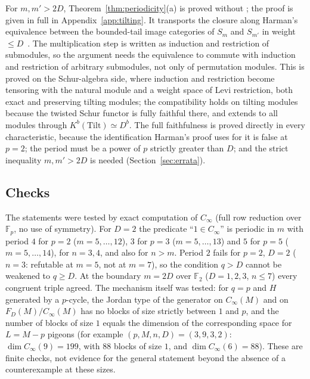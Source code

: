 For $m,m'>2D$, Theorem~\ref{thm:periodicity}(a) is proved without \cite{hone2025}; the proof is
given in full in Appendix~\ref{app:tilting}.  It transports the closure
along Harman's equivalence between the bounded-tail image categories of $S_m$ and $S_{m'}$ in weight
$\le D$~\cite[Thm.~2.9]{harman2015}.  The multiplication step is written as induction and
restriction of submodules, so the argument needs the equivalence to commute with induction
and restriction of arbitrary submodules, not only of permutation modules.  This is proved on
the Schur-algebra side, where induction and restriction become tensoring with the natural
module and a weight space of Levi restriction, both exact and preserving tilting modules; the
compatibility holds on tilting modules because the twisted Schur functor is fully faithful
there, and extends to all modules through $K^b(\mathrm{Tilt})\simeq D^b$.  The full
faithfulness is proved directly in every characteristic, because the identification Harman's
proof uses for it is false at $p=2$; the period must be a power of $p$ strictly greater than
$D$; and the strict inequality $m,m'>2D$ is needed (Section~\ref{sec:errata}).

\subsection{Checks}\label{sec:periodicity-checks}

The statements were tested by exact computation of $C_\infty$ (full row reduction over
$\mathbb F_p$, no use of symmetry).  For $D=2$ the predicate ``$1\in C_\infty$'' is periodic in
$m$ with period $4$ for $p=2$ ($m=5,\dots,12$), $3$ for $p=3$ ($m=5,\dots,13$) and $5$ for
$p=5$ ($m=5,\dots,14$), for $n=3,4$, and also for $n>m$.  Period $2$ fails for $p=2$, $D=2$
($n=3$: refutable at $m=5$, not at $m=7$), so the condition $q>D$ cannot be weakened to
$q\ge D$.  At the boundary $m=2D$ over $\mathbb F_2$ ($D=1,2,3$, $n\le7$) every congruent
triple agreed.  The mechanism itself was tested: for $q=p$ and $H$ generated by a $p$-cycle,
the Jordan type of the generator on $C_\infty(M)$ and on $F_D(M)/C_\infty(M)$ has no blocks of
size strictly between $1$ and $p$, and the number of blocks of size $1$ equals the dimension
of the corresponding space for $L=M-p$ pigeons (for example $(p,M,n,D)=(3,9,3,2)$:
$\dim C_\infty(9)=199$, with $88$ blocks of size $1$, and $\dim C_\infty(6)=88$).  These are
finite checks, not evidence for the general statement beyond the absence of a counterexample
at these sizes.

